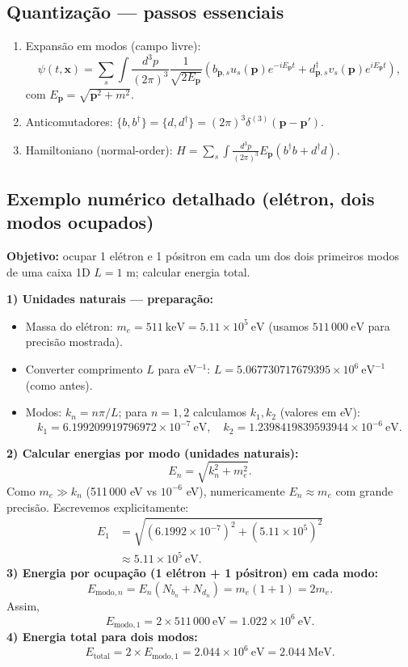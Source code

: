 \documentclass[12pt,a4paper]{article}
\begin{document}
\subsection{Quantização — passos essenciais}
\begin{enumerate}
  \item Expansão em modos (campo livre):
  \[ \psi(t,\mathbf{x}) = \sum_s \int \frac{d^3p}{(2\pi)^3}\frac{1}{\sqrt{2E_{\mathbf{p}}}}\left(b_{\mathbf{p},s}u_s(\mathbf{p})e^{-iE_{\mathbf{p}}t}+d^\dagger_{\mathbf{p},s}v_s(\mathbf{p})e^{iE_{\mathbf{p}}t}\right), \]
  com $E_{\mathbf{p}}=\sqrt{\mathbf{p}^2 + m^2}$.
  \item Anticomutadores: $\{b,b^\dagger\}=\{d,d^\dagger\}=(2\pi)^3\delta^{(3)}(\mathbf{p}-\mathbf{p}')$.
  \item Hamiltoniano (normal-order): $H=\sum_s\int\frac{d^3p}{(2\pi)^3} E_{\mathbf{p}}(b^\dagger b + d^\dagger d)$.
\end{enumerate}

\subsection{Exemplo numérico detalhado (elétron, dois modos ocupados)}
\textbf{Objetivo:} ocupar 1 elétron e 1 pósitron em cada um dos dois primeiros modos de uma caixa 1D $L=1$ m; calcular energia total.

\textbf{1) Unidades naturais — preparação:}
\begin{itemize}
  \item Massa do elétron: $m_e = 511\ \mathrm{keV} = 5.11\times10^5\ \mathrm{eV}$ (usamos $511\,000\ \mathrm{eV}$ para precisão mostrada).
  \item Converter comprimento $L$ para eV$^{-1}$: $L = 5.067730717679395\times10^{6}\ \mathrm{eV^{-1}}$ (como antes).
  \item Modos: $k_n = n\pi/L$; para $n=1,2$ calculamos $k_1,k_2$ (valores em eV):
  \[ k_1 = 6.199209919796972\times10^{-7}\ \mathrm{eV},\quad k_2 = 1.2398419839593944\times10^{-6}\ \mathrm{eV}. \]
\end{itemize}

\textbf{2) Calcular energias por modo (unidades naturais):}
\[ E_{n}=\sqrt{k_n^2 + m_e^2}. \]
Como $m_e\gg k_n$ (511\,000 eV vs $10^{-6}$ eV), numericamente $E_n\approx m_e$ com grande precisão. Escrevemos explicitamente:
\begin{align*}
E_1 &= \sqrt{(6.1992\times10^{-7})^2 + (5.11\times10^{5})^2} \\
&\approx 5.11\times10^{5}\ \mathrm{eV}.
\end{align*}
\textbf{3) Energia por ocupação (1 elétron + 1 pósitron) em cada modo:}
\[ E_{\text{modo},n} = E_n (N_{b_n}+N_{d_n}) = m_e (1+1) = 2m_e. \]
Assim,
\[ E_{\text{modo},1} = 2\times511\,000\ \mathrm{eV} = 1.022\times10^{6}\ \mathrm{eV}. \]
\textbf{4) Energia total para dois modos:}
\[ E_{\text{total}} = 2\times E_{\text{modo},1} = 2.044\times10^{6}\ \mathrm{eV} = 2.044\ \mathrm{MeV}. \]
\end{document}
